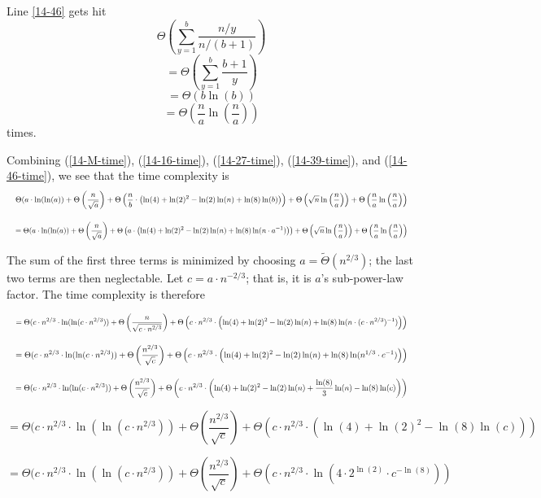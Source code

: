 \documentclass[12pt]{article}
\newcommand{\eqn}[1]{\begin{displaymath} #1 \end{displaymath}}
\newcommand{\neqn}[1]{\begin{equation} #1 \end{equation}}
\newcommand{\tweqn}[1]{\begin{displaymath}\resizebox{\textwidth}{!}{$\displaystyle #1 $}\end{displaymath}}
\newcommand{\softTheta}[0]{\widetilde{\Theta}}
\begin{document}
Line \ref{14-46} gets hit
\eqn{\Theta\left( \sum_{y=1}^b \frac{n/y}{n/(b+1)} \right)}
\eqn{= \Theta\left( \sum_{y=1}^b \frac{b+1}{y} \right)}
\eqn{= \Theta\left( b \ln(b) \right)}
\neqn{= \Theta\left( \frac{n}{a} \ln\left(\frac{n}{a}\right) \right) \label{14-46-time}}
times.

Combining (\ref{14-M-time}), (\ref{14-16-time}), (\ref{14-27-time}), (\ref{14-39-time}), and (\ref{14-46-time}), we see that the time complexity is
\tweqn{\Theta( a \cdot \ln(\ln(a)) + \Theta\left(\frac{n}{\sqrt{a}}\right) + \Theta \left( \frac{n}{b} \cdot \left( \ln(4) + \ln(2)^2 - \ln(2) \ln(n) + \ln(8)\ln(b) \right)\right) + \Theta\left( \sqrt{n} \ln\left(\frac{n}{a}\right) \right) + \Theta\left( \frac{n}{a} \ln\left(\frac{n}{a}\right) \right)}

\tweqn{= \Theta( a \cdot \ln(\ln(a)) + \Theta\left(\frac{n}{\sqrt{a}}\right) + \Theta \left( a \cdot \left( \ln(4) + \ln(2)^2 - \ln(2) \ln(n) + \ln(8)\ln(n \cdot a^{-1}) \right)\right) + \Theta\left( \sqrt{n} \ln\left(\frac{n}{a}\right) \right) + \Theta\left( \frac{n}{a} \ln\left(\frac{n}{a}\right) \right)}

The sum of the first three terms is minimized by choosing $a = \softTheta(n^{2/3})$; the last two terms are then neglectable.  Let $c = a \cdot n^{-2/3}$; that is, it is $a$'s sub-power-law factor.  The time complexity is therefore

\tweqn{= \Theta( c \cdot n^{2/3} \cdot \ln(\ln(c \cdot n^{2/3})) + \Theta\left(\frac{n}{\sqrt{c \cdot n^{2/3}}}\right) + \Theta \left( c \cdot n^{2/3} \cdot \left( \ln(4) + \ln(2)^2 - \ln(2) \ln(n) + \ln(8)\ln(n \cdot (c \cdot n^{2/3})^{-1}) \right)\right)}

\tweqn{= \Theta( c \cdot n^{2/3} \cdot \ln(\ln(c \cdot n^{2/3})) + \Theta\left(\frac{n^{2/3}}{\sqrt{c}}\right) + \Theta \left( c \cdot n^{2/3} \cdot \left( \ln(4) + \ln(2)^2 - \ln(2) \ln(n) + \ln(8)\ln(n^{1/3} \cdot c^{-1}) \right)\right)}

\tweqn{= \Theta( c \cdot n^{2/3} \cdot \ln(\ln(c \cdot n^{2/3})) + \Theta\left(\frac{n^{2/3}}{\sqrt{c}}\right) + \Theta \left( c \cdot n^{2/3} \cdot \left( \ln(4) + \ln(2)^2 - \ln(2) \ln(n) + \frac{\ln(8)}{3} \ln(n) - \ln(8) \ln(c) \right)\right)}

\eqn{= \Theta( c \cdot n^{2/3} \cdot \ln(\ln(c \cdot n^{2/3})) + \Theta\left(\frac{n^{2/3}}{\sqrt{c}}\right) + \Theta \left( c \cdot n^{2/3} \cdot \left( \ln(4) + \ln(2)^2 - \ln(8) \ln(c) \right)\right)}

\eqn{= \Theta( c \cdot n^{2/3} \cdot \ln(\ln(c \cdot n^{2/3})) + \Theta\left(\frac{n^{2/3}}{\sqrt{c}}\right) + \Theta \left( c \cdot n^{2/3} \cdot \ln\left( 4 \cdot 2^{\ln(2)} \cdot c^{-\ln(8)} \right)\right)}
\end{document}
